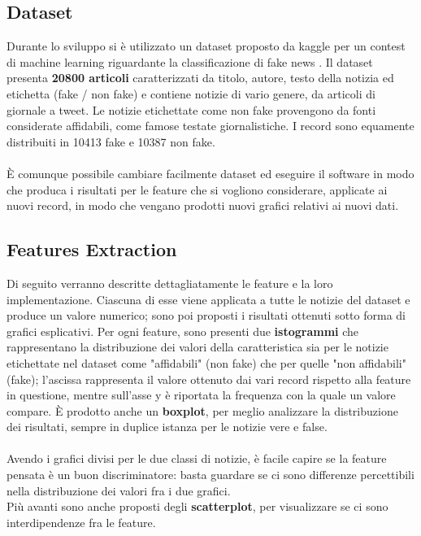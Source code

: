 \documentclass{article}
\begin{document}
\begin{multicols}{2}
			\subsection{Dataset}
			Durante lo sviluppo si è utilizzato un dataset proposto da kaggle per un contest di machine learning riguardante la classificazione di fake news \cite{kaggledataset}. Il dataset presenta \textbf{20800 articoli} caratterizzati da titolo, autore, testo della notizia ed etichetta (fake / non fake) e contiene notizie di vario genere, da articoli di giornale a tweet. Le notizie etichettate come non fake provengono da fonti considerate affidabili, come famose testate giornalistiche. I record sono equamente distribuiti in 10413 fake e 10387 non fake.
			\\~\\
			È comunque possibile cambiare facilmente dataset ed eseguire il software in modo che produca i risultati per le feature che si vogliono considerare, applicate ai nuovi record, in modo che vengano prodotti nuovi grafici relativi ai nuovi dati.
			
			
			\subsection{Features Extraction}
			Di seguito verranno descritte dettagliatamente le feature e la loro implementazione.
			Ciascuna di esse viene applicata a tutte le notizie del dataset e produce un valore numerico; sono poi proposti i risultati ottenuti sotto forma di grafici esplicativi. Per ogni feature, sono presenti due \textbf{istogrammi} che rappresentano la distribuzione dei valori della caratteristica sia per le notizie etichettate nel dataset come "affidabili" (non fake) che per quelle "non affidabili" (fake); l'ascissa rappresenta il valore ottenuto dai vari record rispetto alla feature in questione, mentre sull'asse y è riportata la frequenza con la quale un valore compare. È prodotto anche un \textbf{boxplot}, per meglio analizzare la distribuzione dei risultati, sempre in duplice istanza per le notizie vere e false.\\~\\
			Avendo i grafici divisi per le due classi di notizie, è facile capire se la feature pensata è un buon discriminatore: basta guardare se ci sono differenze percettibili nella distribuzione dei valori fra i due grafici.\\
			Più avanti sono anche proposti degli \textbf{scatterplot}, per visualizzare se ci sono interdipendenze fra le feature.
			

\end{multicols}
\end{document}

